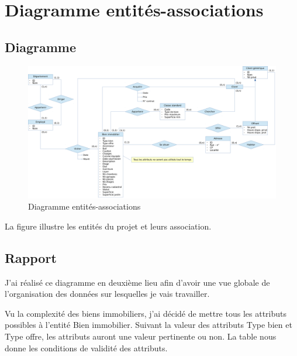 \chapter{Diagramme entités-associations}

\section{Diagramme}

\begin{figure}
  \centering
  \includegraphics[angle=90,height=0.99\textheight]{IMG/er}
  \caption{Diagramme entités-associations}
  \label{img_er}
\end{figure}

La figure  illustre les entités du projet et leurs association.

\section{Rapport}

J'ai réalisé ce diagramme en deuxième lieu afin d'avoir une vue globale de l'organisation des données sur lesquelles je vais travailler.

Vu la complexité des biens immobiliers, j'ai décidé de mettre tous les attributs possibles à l'entité \og{}Bien immobilier\fg{}. Suivant la valeur des attributs \og{}Type bien\fg{} et \og{}Type offre\fg{}, les attributs auront une valeur pertinente ou non. La table  nous donne les conditions de validité des attributs.


